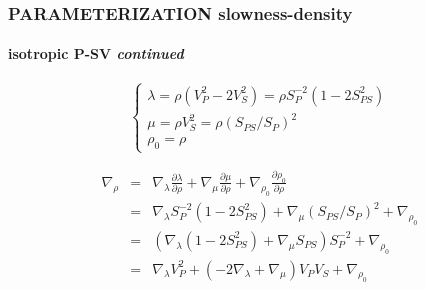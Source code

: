 \documentclass[9pt]{beamer}
\newcommand{\partderi}[2]{\frac{\partial#1}{\partial#2}}
\begin{document}
\begin{frame}\frametitle{PARAMETERIZATION slowness-density}
\framesubtitle{isotropic P-SV \textit{continued}}
  
  \begin{center}
  \end{center}
  
  \[\left\{ \begin{array}{l}
    \lambda = \rho (V_P^{2}-2V_S ^2) = \rho S_P^{-2} (1-2S_{PS}^2) \\
    \mu    = \rho V_S^2 = \rho (S_{PS}/S_P)^2 \\
    \rho_0 = \rho 
  \end{array} \right.\]
  
  \begin{eqnarray}
    \nabla_{\rho} &=& \nabla_\lambda \partderi{\lambda}{\rho} + \nabla_\mu \partderi{\mu}{\rho} + \nabla_{\rho_0} \partderi{\rho_0}{\rho} \nonumber\\
		  &=& \nabla_\lambda S_P^{-2} (1-2S_{PS}^2) + \nabla_\mu (S_{PS}/S_P)^2 + \nabla_{\rho_0} \nonumber\\
		  &=& \left(\nabla_\lambda (1-2S_{PS}^2) + \nabla_\mu S_{PS} \right) S_P^{-2} + \nabla_{\rho_0} \nonumber\\
		  &=& \nabla_\lambda V_P^2 + (-2\nabla_\lambda+\nabla_\mu) V_PV_S + \nabla_{\rho_0} \nonumber
  \end{eqnarray}

\end{frame}
\end{document}
